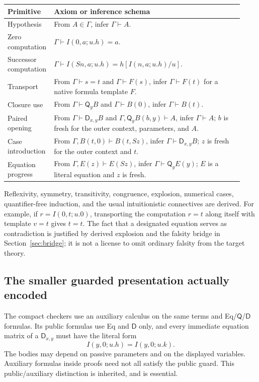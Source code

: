 \documentclass[11pt]{article}
\theoremstyle{definition}
\theoremstyle{remark}
\newcommand{\D}{\mathsf D}
\newcommand{\Q}{\mathsf Q}
\begin{document}
\begin{center}
\small
\begin{tabular}{p{0.14\linewidth}p{0.79\linewidth}}
\toprule
Primitive & Axiom or inference schema\\
\midrule
Hypothesis & From $A\in\Gamma$, infer $\Gamma\vdash A$.\\[0.4em]
Zero computation & $\Gamma\vdash I(0,a;u.h)=a$.\\[0.4em]
Successor computation & $\Gamma\vdash I(Sn,a;u.h)=h[I(n,a;u.h)/u]$.\\[0.4em]
Transport & From $\Gamma\vdash s=t$ and $\Gamma\vdash F(s)$,
 infer $\Gamma\vdash F(t)$ for a native formula template $F$.\\[0.4em]
Closure use & From $\Gamma\vdash\Q_y B$ and $\Gamma\vdash B(0)$,
 infer $\Gamma\vdash B(t)$.\\[0.4em]
Paired opening & From $\Gamma\vdash\D_{x,y}B$ and
 $\Gamma,\Q_yB(b,y)\vdash A$, infer $\Gamma\vdash A$;
 $b$ is fresh for the outer context, parameters, and $A$.\\[0.4em]
Case introduction & From $\Gamma,B(t,0)\vdash B(t,Sz)$,
 infer $\Gamma\vdash\D_{x,y}B$;
 $z$ is fresh for the outer context and $t$.\\[0.4em]
Equation progress & From $\Gamma,E(z)\vdash E(Sz)$,
 infer $\Gamma\vdash\Q_yE(y)$;
 $E$ is a literal equation and $z$ is fresh.\\
\bottomrule
\end{tabular}
\end{center}

Reflexivity, symmetry, transitivity, congruence, explosion, numerical cases,
quantifier-free induction, and the usual intuitionistic connectives are
derived.  For example, if $r=I(0,t;u.0)$, transporting the computation
$r=t$ along itself with template $v=t$ gives $t=t$.  The fact that a
designated equation serves as contradiction is justified by derived
explosion and the falsity bridge in Section~\ref{sec:bridge}; it is not a
license to omit ordinary falsity from the target theory.

\subsection{The smaller guarded presentation actually encoded}

The compact checkers use an auxiliary calculus on the same terms and
Eq/$\Q$/$\D$ formulas.  Its public formulas use Eq and $\D$ only, and every
immediate equation matrix of a $\D_{x,y}$ must have the literal form
\[
 I(y,0;u.h)=I(y,0;u.k).
 \tag{G}\label{eq:guard}
\]
The bodies may depend on passive parameters and on the displayed variables.
Auxiliary formulas inside proofs need not all satisfy the public guard.
This public/auxiliary distinction is inherited, and is essential.
\end{document}
